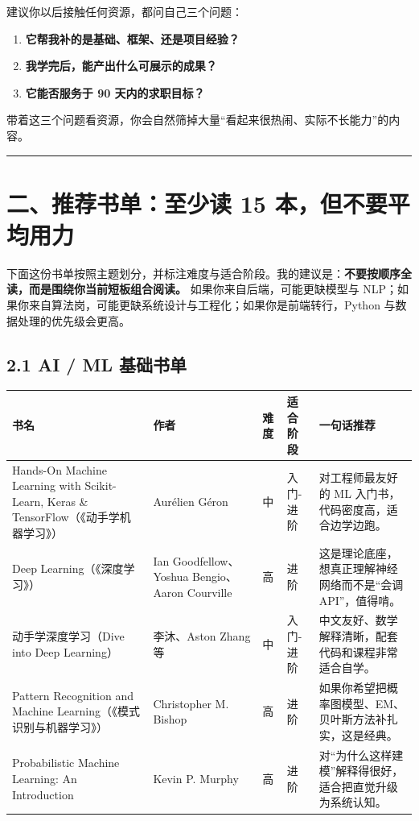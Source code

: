 建议你以后接触任何资源，都问自己三个问题：


\begin{enumerate}[leftmargin=2em]
\item \textbf{它帮我补的是基础、框架、还是项目经验？}
\item \textbf{我学完后，能产出什么可展示的成果？}
\item \textbf{它能否服务于 90 天内的求职目标？}
\end{enumerate}

带着这三个问题看资源，你会自然筛掉大量``看起来很热闹、实际不长能力''的内容。


\bigskip\hrule\bigskip

\section{二、推荐书单：至少读 15 本，但不要平均用力}

下面这份书单按照主题划分，并标注难度与适合阶段。我的建议是：\textbf{不要按顺序全读，而是围绕你当前短板组合阅读。} 如果你来自后端，可能更缺模型与 NLP；如果你来自算法岗，可能更缺系统设计与工程化；如果你是前端转行，Python 与数据处理的优先级会更高。


\subsection{2.1 AI / ML 基础书单}

\begingroup
\scriptsize
\setlength{\tabcolsep}{3pt}
\begin{longtable}{|p{}|p{}|p{}|p{}|p{}|}
\hline
书名 & 作者 & 难度 & 适合阶段 & 一句话推荐 \\ \hline
Hands-On Machine Learning with Scikit-Learn, Keras \& TensorFlow（《动手学机器学习》） & Aurélien Géron & 中 & 入门-进阶 & 对工程师最友好的 ML 入门书，代码密度高，适合边学边跑。 \\ \hline
Deep Learning（《深度学习》） & Ian Goodfellow、Yoshua Bengio、Aaron Courville & 高 & 进阶 & 这是理论底座，想真正理解神经网络而不是``会调 API''，值得啃。 \\ \hline
动手学深度学习（Dive into Deep Learning） & 李沐、Aston Zhang 等 & 中 & 入门-进阶 & 中文友好、数学解释清晰，配套代码和课程非常适合自学。 \\ \hline
Pattern Recognition and Machine Learning（《模式识别与机器学习》） & Christopher M. Bishop & 高 & 进阶 & 如果你希望把概率图模型、EM、贝叶斯方法补扎实，这是经典。 \\ \hline
Probabilistic Machine Learning: An Introduction & Kevin P. Murphy & 高 & 进阶 & 对``为什么这样建模''解释得很好，适合把直觉升级为系统认知。 \\ \hline
\end{longtable}
\endgroup

